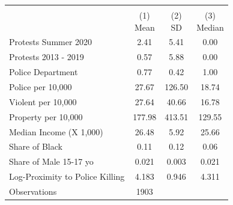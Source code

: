 {
\def\sym#1{\ifmmode^{#1}\else\(^{#1}\)\fi}
\begin{tabular}{l*{1}{ccc}}
\hline\hline
                    &\multicolumn{3}{c}{ }                 \\
                    &\shortstack{(1) \\ Mean}&\shortstack{(2) \\ SD }&\shortstack{(3) \\ Median}\\
\hline
Protests Summer 2020&        2.41&        5.41&        0.00\\
Protests 2013 - 2019&        0.57&        5.88&        0.00\\
Police Department   &        0.77&        0.42&        1.00\\
Police per 10,000   &       27.67&      126.50&       18.74\\
Violent per 10,000  &       27.64&       40.66&       16.78\\
Property per 10,000 &      177.98&      413.51&      129.55\\
Median Income (X 1,000)&       26.48&        5.92&       25.66\\
Share of Black      &        0.11&        0.12&        0.06\\
Share of Male 15-17 yo&       0.021&       0.003&       0.021\\
Log-Proximity to Police Killing&       4.183&       0.946&       4.311\\
\hline
Observations        &        1903&            &            \\
\hline\hline
\end{tabular}
}
